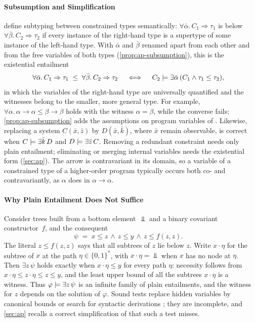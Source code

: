 \paragraph{Subsumption and Simplification}
\citet{TrifonovSmith96} define subtyping between constrained types
semantically: $\forall\bar\alpha.\,C_1\Rightarrow\tau_1$ is below
$\forall\bar\beta.\,C_2\Rightarrow\tau_2$ if every instance of the right-hand
type is a supertype of some instance of the left-hand type. With $\bar\alpha$
and $\bar\beta$ renamed apart from each other and from the free variables of
both types (\cref{prop:ap-subsumption}), this is the existential entailment
\begin{equation}\label{eq:intro-subsumption}
  \forall\bar\alpha.\,C_1\Rightarrow\tau_1
  \;\le\;
  \forall\bar\beta.\,C_2\Rightarrow\tau_2
  \quad\iff\quad
  C_2\models\exists\bar\alpha\,(C_1\wedge\tau_1\le\tau_2),
\end{equation}
in which the variables of the right-hand type are universally quantified and
the witnesses belong to the smaller, more general type. For example,
$\forall\alpha.\,\alpha\to\alpha\le\beta\to\beta$ holds with the witness
$\alpha=\beta$, while the converse fails; \cref{prop:ap-subsumption} adds the
assumptions on program variables of \citet{TrifonovSmith96}. Likewise,
replacing a system $C(\bar x,\bar z)$ by $D(\bar x,\bar k)$, where $\bar x$
remain observable, is correct when $C\models\exists\bar k\,D$ and
$D\models\exists\bar z\,C$. Removing a redundant constraint needs only plain
entailment; eliminating or merging internal variables needs the existential
form (\cref{sec:ap}). The arrow is contravariant in its domain, so a variable
of a constrained type of a higher-order program typically occurs both co- and
contravariantly, as $\alpha$ does in $\alpha\to\alpha$.

\paragraph{Why Plain Entailment Does Not Suffice}
Consider trees built from a bottom element~$\Bot$ and a binary covariant
constructor~$f$, and the consequent
\[
  \psi \;=\; x\le z \,\wedge\, z\le y \,\wedge\, z\le f(z,z).
\]
The literal $z\le f(z,z)$ says that all subtrees of $z$ lie below $z$. Write
$x\cdot\eta$ for the subtree of $x$ at the path $\eta\in\{0,1\}^*$, with
$x\cdot\eta=\Bot$ when $x$ has no node at $\eta$. Then $\exists z\,\psi$ holds
exactly when $x\cdot\eta\le y$ for every path $\eta$: necessity follows from
$x\cdot\eta\le z\cdot\eta\le z\le y$, and the least upper bound of all the
subtrees $x\cdot\eta$ is a witness. Thus $\varphi\models\exists z\,\psi$ is an
infinite family of plain entailments, and the witness for $z$ depends on the
solution of $\varphi$. Sound tests replace hidden variables by canonical
bounds or search for syntactic derivations
\citep{TrifonovSmith96,Pottier01}; they are incomplete, and \cref{sec:ap}
recalls a correct simplification of \citet{Pottier98thesis} that such a test
misses.

